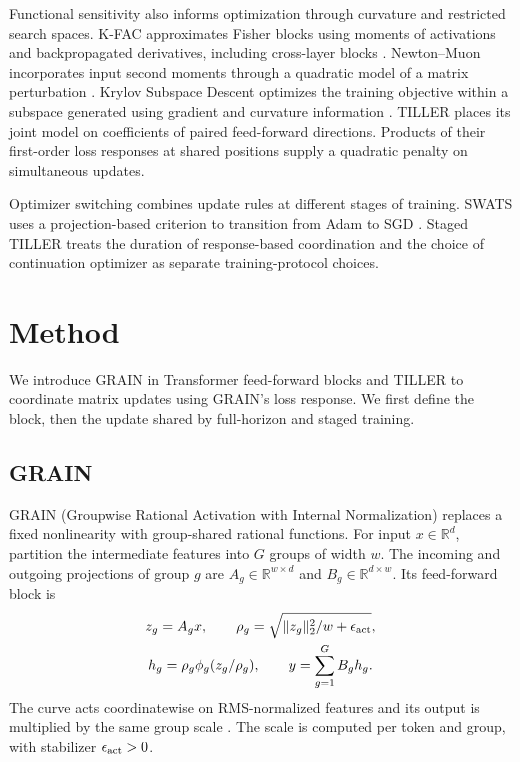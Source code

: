 \documentclass{article}
\begin{document}
Functional sensitivity also informs optimization through curvature and
restricted search spaces. K-FAC approximates Fisher blocks using moments
of activations and backpropagated derivatives, including cross-layer
blocks \citep{martens2015kfac}. Newton--Muon incorporates input
second moments through a quadratic model of a matrix perturbation
\citep{du2026newtonmuon}. Krylov Subspace Descent optimizes the training
objective within a subspace generated using gradient and curvature
information \citep{vinyals2012krylov}. TILLER places its joint model on
coefficients of paired feed-forward directions. Products of their
first-order loss responses at shared positions supply a quadratic
penalty on simultaneous updates.

Optimizer switching combines update rules at different stages of
training. SWATS uses a projection-based criterion to transition from
Adam to SGD \citep{keskar2017switching}. Staged TILLER treats the duration
of response-based coordination and the choice of continuation optimizer
as separate training-protocol choices.



\section{Method}
\label{sec:method}

We introduce GRAIN in Transformer feed-forward blocks and TILLER
to coordinate matrix updates using GRAIN's loss response. We first define
the block, then the update shared by full-horizon and staged training.

\subsection{GRAIN}

GRAIN (Groupwise Rational Activation with Internal Normalization)
replaces a fixed nonlinearity with group-shared rational functions.
For input $x\in\mathbb R^d$, partition the intermediate features
into $G$ groups of width $w$. The incoming and outgoing projections
of group $g$ are $A_g\in\mathbb R^{w\times d}$ and
$B_g\in\mathbb R^{d\times w}$. Its feed-forward block is
\begin{equation}
 \begin{gathered}
 z_g=A_gx,\qquad
 \rho_g=\sqrt{\|z_g\|_2^2/w+\epsilon_{\rm act}},\\
 h_g=\rho_g\phi_g(z_g/\rho_g),\qquad
 y=\sum_{g=1}^{G}B_gh_g.
 \end{gathered}
 \label{eq:overview-grain}
\end{equation}
The curve acts coordinatewise on RMS-normalized features and its
output is multiplied by the same group scale
\citep{zhang2019rmsnorm}. The scale is computed per token and
group, with stabilizer $\epsilon_{\rm act}>0$.
\end{document}
